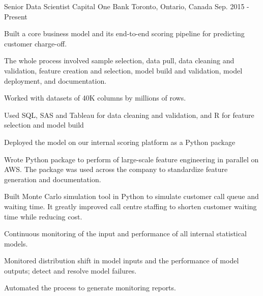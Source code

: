 

\begin{cventries}

  \cventry
    {Senior Data Scientist} %
    {Capital One Bank} %
    {Toronto, Ontario, Canada} %
    {Sep. 2015 - Present} %
    {
      \begin{cvitems} %
        \item {Built a core business model and its end-to-end scoring pipeline for predicting customer charge-off.}\\
        \begin{cvitems}
          \item {The whole process involved sample selection, data pull, data cleaning and validation, feature creation and selection, model build and validation, model deployment, and documentation.}
          \item {Worked with datasets of 40K columns by millions of rows.}
          \item {Used SQL, SAS and Tableau for data cleaning and validation, and R for feature selection and model build}
          \item {Deployed the model on our internal scoring platform as a Python package}\\
        \end{cvitems}
        \item {Wrote Python package to perform of large-scale feature engineering in parallel on AWS. The package was used across the company to standardize feature generation and documentation.}
        \item {Built Monte Carlo simulation tool in Python to simulate customer call queue and waiting time. It greatly improved call centre staffing to shorten customer waiting time while reducing cost.}
        \item {Continuous monitoring of the input and performance of all internal statistical models.}\\
        \begin{cvitems}
          \item {Monitored distribution shift in model inputs and the performance of model outputs; detect and resolve model failures.}
          \item {Automated the process to generate monitoring reports.}\\
        \end{cvitems}
      \end{cvitems}
    }

\end{cventries}
